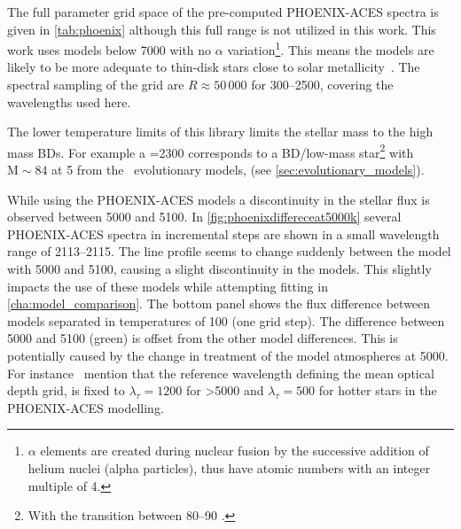 The full parameter grid space of the pre-computed {PHOENIX-ACES} spectra is given in \cref{tab:phoenix} although this full range is not utilized in this work.
This work uses models below 7000\K{} with no \(\alpha\) variation\footnote{$\alpha$ elements are created during nuclear fusion by the successive addition of helium nuclei (alpha particles), thus have atomic numbers with an integer multiple of 4.}.
This means the models are likely to be more adequate to thin-disk stars close to solar metallicity~\citep{adibekyan_chemical_2012}.
The spectral sampling of the grid are $R\approx50\,000$ for 300--2500\nm{}, covering the wavelengths used here.



The lower temperature limits of this library limits the stellar mass to the high mass {BD}s.
For example a \Teff{}=2300\K{} corresponds to a {BD/low-mass star}\footnote{With the transition between 80--90 \Mjup{}.} with \(\textrm{M}\sim84\)\Mjup{} at 5\Gyr{} from the~\citet{baraffe_evolutionary_2003} evolutionary models, (see \cref{sec:evolutionary_models}).


While using the {PHOENIX-ACES} models a discontinuity in the stellar flux is observed between 5000\K{} and 5100\K{}.
In \cref{fig:phoenixdiffereceat5000k} several {PHOENIX-ACES} spectra in incremental steps are shown in a small wavelength range of 2113--2115\nm{}.
The line profile seems to change suddenly between the model with 5000\K{} and 5100\K{}, causing a slight discontinuity in the models.
This slightly impacts the use of these models while attempting \textchisquared{} fitting in \cref{cha:model_comparison}.
The bottom panel shows the flux difference between models separated in temperatures of 100\K{} (one grid step).
The difference between 5000 and 5100\K{} (green) is offset from the other model differences.
This is potentially caused by the change in treatment of the model atmospheres at 5000\K{}.
For instance~\citet{husser_new_2013} mention that the reference wavelength defining the mean optical depth grid, is fixed to $\lambda_{\tau}=1200$\nm{} for \Teff{}>5000\K{} and $\lambda_{\tau}=500$\nm{} for hotter stars in the {PHOENIX-ACES} modelling.

